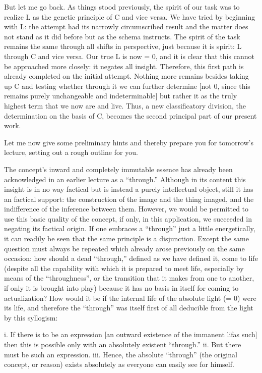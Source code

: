 But let me go back.
As things stood previously,
the spirit of our task was to realize
L as the genetic principle of C and vice versa.
We have tried by beginning with L:
the attempt had its narrowly circumscribed result
and the matter does not stand as it did before
but as the schema instructs.
The spirit of the task remains the same
through all shifts in perspective,
just because it is spirit:
L through C and vice versa.
Our true L is now = 0,
and it is clear that
this cannot be approached more closely:
it negates all insight.
Therefore, this first path is
already completed on the initial attempt.
Nothing more remains besides
taking up C and testing whether
through it we can further determine
[not 0, since this remains purely
unchangeable and indeterminable]
but rather it as the truly highest term
that we now are and live.
Thus, a new classificatory division,
the determination on the basis of C,
becomes the second principal part
of our present work.

Let me now give some preliminary hints
and thereby prepare you for tomorrow’s lecture,
setting out a rough outline for you.

The concept’s inward and completely immutable essence has
already been acknowledged in an earlier lecture as a “through.”
Although in its content this insight is in no way factical
but is instead a purely intellectual object,
still it has an factical support:
the construction of the image and the thing imaged,
and the indifference of the inference between them.
However, we would be permitted to use this basic quality of the concept,
if only, in this application, we succeeded in negating its factical origin.
If one embraces a “through” just a little energetically,
it can readily be seen that the same principle is a disjunction.
Except the same question must always be repeated which
already arose previously on the same occasion:
how should a dead “through,” defined as we have defined it,
come to life
(despite all the capability with
which it is prepared to meet life,
especially by means of the “throughness”,
or the transition that it makes from one to another,
if only it is brought into play)
because it has no basis in itself
for coming to actualization?
How would it be if the internal life
of the absolute light (= 0) were its life,
and therefore the “through” was itself
first of all deducible from the light by this syllogism:

i. If there is to be an expression
[an outward existence of the immanent lifas such]
then this is possible only with an absolutely existent “through.”
ii. But there must be such an expression.
iii. Hence, the absolute “through” (the original concept, or reason)
exists absolutely as everyone can easily see for himself.

